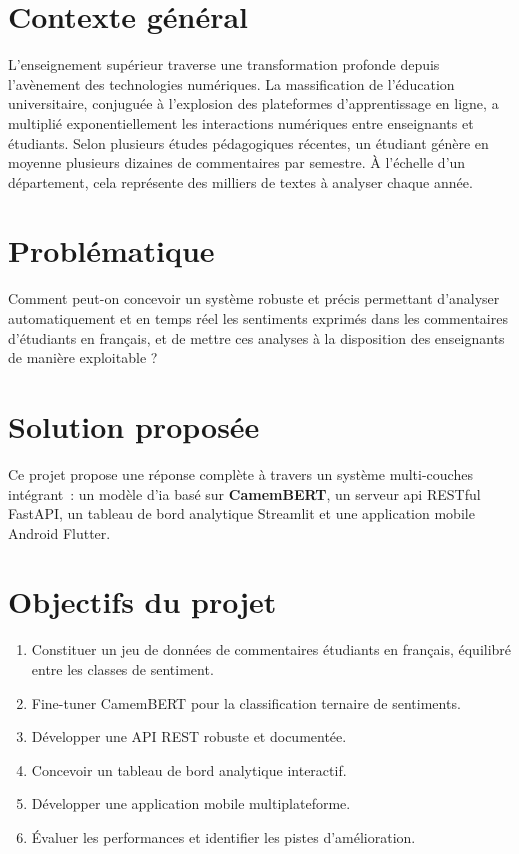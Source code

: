 \documentclass[12pt,a4paper,oneside]{report}
\begin{document}
\section*{Contexte général}

L'enseignement supérieur traverse une transformation profonde depuis
l'avènement des technologies numériques. La massification de l'éducation
universitaire, conjuguée à l'explosion des plateformes d'apprentissage en
ligne, a multiplié exponentiellement les interactions numériques entre
enseignants et étudiants. Selon plusieurs études pédagogiques récentes,
un étudiant génère en moyenne plusieurs dizaines de commentaires par
semestre. À l'échelle d'un département, cela représente des milliers de
textes à analyser chaque année.

\section*{Problématique}

Comment peut-on concevoir un système robuste et précis permettant d'analyser
automatiquement et en temps réel les sentiments exprimés dans les commentaires
d'étudiants en français, et de mettre ces analyses à la disposition des
enseignants de manière exploitable ?

\section*{Solution proposée}

Ce projet propose une réponse complète à travers un système multi-couches
intégrant~: un modèle d'\acrfull{ia} basé sur \textbf{CamemBERT}, un
serveur \acrfull{api} RESTful FastAPI, un tableau de bord analytique Streamlit
et une application mobile Android Flutter.

\section*{Objectifs du projet}

\begin{enumerate}[leftmargin=2.5em]
  \item Constituer un jeu de données de commentaires étudiants en français,
        équilibré entre les classes de sentiment.
  \item Fine-tuner CamemBERT pour la classification ternaire de sentiments.
  \item Développer une API REST robuste et documentée.
  \item Concevoir un tableau de bord analytique interactif.
  \item Développer une application mobile multiplateforme.
  \item Évaluer les performances et identifier les pistes d'amélioration.
\end{enumerate}
\end{document}

